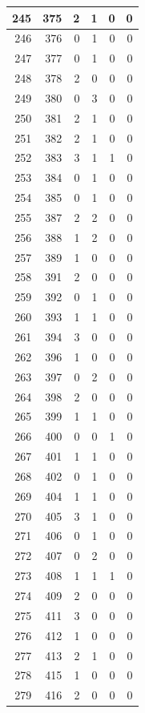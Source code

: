 \documentclass[
  letterpaper,
  DIV=11,
  numbers=noendperiod]{scrreprt}
\begin{document}
\begin{tabular}{r|r|r|r|r|r}
\hline
245 & 375 & 2 & 1 & 0 & 0\\
\hline
246 & 376 & 0 & 1 & 0 & 0\\
\hline
247 & 377 & 0 & 1 & 0 & 0\\
\hline
248 & 378 & 2 & 0 & 0 & 0\\
\hline
249 & 380 & 0 & 3 & 0 & 0\\
\hline
250 & 381 & 2 & 1 & 0 & 0\\
\hline
251 & 382 & 2 & 1 & 0 & 0\\
\hline
252 & 383 & 3 & 1 & 1 & 0\\
\hline
253 & 384 & 0 & 1 & 0 & 0\\
\hline
254 & 385 & 0 & 1 & 0 & 0\\
\hline
255 & 387 & 2 & 2 & 0 & 0\\
\hline
256 & 388 & 1 & 2 & 0 & 0\\
\hline
257 & 389 & 1 & 0 & 0 & 0\\
\hline
258 & 391 & 2 & 0 & 0 & 0\\
\hline
259 & 392 & 0 & 1 & 0 & 0\\
\hline
260 & 393 & 1 & 1 & 0 & 0\\
\hline
261 & 394 & 3 & 0 & 0 & 0\\
\hline
262 & 396 & 1 & 0 & 0 & 0\\
\hline
263 & 397 & 0 & 2 & 0 & 0\\
\hline
264 & 398 & 2 & 0 & 0 & 0\\
\hline
265 & 399 & 1 & 1 & 0 & 0\\
\hline
266 & 400 & 0 & 0 & 1 & 0\\
\hline
267 & 401 & 1 & 1 & 0 & 0\\
\hline
268 & 402 & 0 & 1 & 0 & 0\\
\hline
269 & 404 & 1 & 1 & 0 & 0\\
\hline
270 & 405 & 3 & 1 & 0 & 0\\
\hline
271 & 406 & 0 & 1 & 0 & 0\\
\hline
272 & 407 & 0 & 2 & 0 & 0\\
\hline
273 & 408 & 1 & 1 & 1 & 0\\
\hline
274 & 409 & 2 & 0 & 0 & 0\\
\hline
275 & 411 & 3 & 0 & 0 & 0\\
\hline
276 & 412 & 1 & 0 & 0 & 0\\
\hline
277 & 413 & 2 & 1 & 0 & 0\\
\hline
278 & 415 & 1 & 0 & 0 & 0\\
\hline
279 & 416 & 2 & 0 & 0 & 0\\

\end{tabular}
\end{document}
